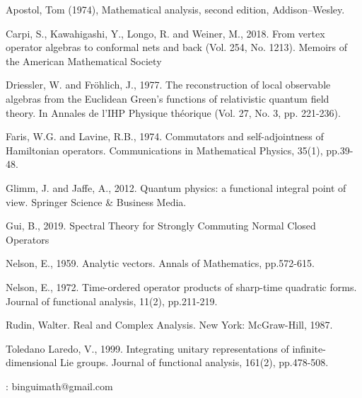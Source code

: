 \documentclass[12pt,a4paper,notitlepage]{article}
\theoremstyle{definition}
\theoremstyle{plain}
\numberwithin{equation}{subsection}
\begin{document}
	
	
	

	
\newpage












\printindex	
	\begin{thebibliography}{999999}
		\footnotesize	


Apostol, Tom (1974), Mathematical analysis, second edition, Addison–Wesley.

		
		
Carpi, S., Kawahigashi, Y., Longo, R. and Weiner, M., 2018. From vertex operator algebras to conformal nets and back (Vol. 254, No. 1213). Memoirs of the American Mathematical Society	

Driessler, W. and Fröhlich, J., 1977. The reconstruction of local observable algebras from the Euclidean Green's functions of relativistic quantum field theory. In Annales de l'IHP Physique théorique (Vol. 27, No. 3, pp. 221-236).

Faris, W.G. and Lavine, R.B., 1974. Commutators and self-adjointness of Hamiltonian operators. Communications in Mathematical Physics, 35(1), pp.39-48.	
		
Glimm, J. and Jaffe, A., 2012. Quantum physics: a functional integral point of view. Springer Science \& Business Media.		
		
Gui, B., 2019. Spectral Theory for Strongly Commuting Normal Closed Operators

Nelson, E., 1959. Analytic vectors. Annals of Mathematics, pp.572-615.

Nelson, E., 1972. Time-ordered operator products of sharp-time quadratic forms. Journal of functional analysis, 11(2), pp.211-219.


Rudin, Walter. Real and Complex Analysis. New York: McGraw-Hill, 1987.
		
		
		
Toledano Laredo, V., 1999. Integrating unitary representations of infinite-dimensional Lie groups. Journal of functional analysis, 161(2), pp.478-508.
		
\end{thebibliography}
	
	: binguimath@gmail.com
\end{document}
